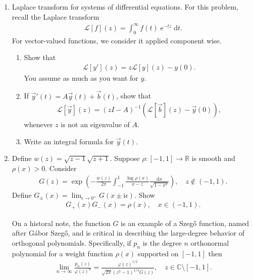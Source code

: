 \documentclass[10pt]{amsart}
\newcommand{\D}{\mathrm{d}}
\newcommand{\I}{\mathrm{i}}
\DeclareMathOperator{\E}{e}
\theoremstyle{nonumberplain}
\begin{document}
\begin{enumerate}[label={\bf {\arabic*}:}]
\item  Laplace transform for systems of differential equations.  For
  this problem, recall the Laplace transform
  \begin{align*}
    \mathcal L[f](z) = \int_0^\infty f(t) \E^{-t z} \D t.
  \end{align*}
  For vector-valued functions, we consider it applied component wise.
  \begin{enumerate}
  \item Show that
    \begin{align*}
     \mathcal L[y'](z) =  z \mathcal L[y](z) - y(0).
    \end{align*}
    You assume as much as you want for $y$.
  \item If $\vec y'(t) = A \vec y(t) + \vec b(t)$, show that
    \begin{align*}
      \mathcal L [\vec y](z) = (z I - A)^{-1} (\mathcal L[\vec b](z) -
      \vec y(0)),
    \end{align*}
    whenever $z$ is not an eigenvalue of $A$.
  \item Write an integral formula for $\vec y(t)$.\\
  \end{enumerate}

\item Define $w(z) = \sqrt{z -1} \sqrt{z + 1}$.   Suppose $\rho :
  [-1,1] \to \mathbb R$ is smooth and $\rho(x) > 0$.  Consider
  \begin{align*}
    G(z) = \exp \left(  -\frac{w(z)}{2 \pi} \int_{-1}^1  \frac{\log
    \rho(x)}{x - z} \frac{\D
   x}{\sqrt{1 - x^2}}\right), \quad z \not\in (-1,1).
  \end{align*}
  Define $G_\pm (x) = \lim_{\epsilon \to 0^+} G(x \pm \I \epsilon)$.
  Show
  \begin{align*}
    G_+(x) G_-(x)= \rho(x), \quad x \in (-1,1).
  \end{align*}

\vspace{1in}

  
  On a historal note, the function $G$ is an example of a Szeg\H{o} function, named
  after G\'abor Szeg\H{o}, and
  is critical in describing the large-degree behavior of orthogonal
  polynomials.  Specifically, if $p_n$ is the degree $n$ orthonormal
  polynomial for a weight function $\rho(x)$ supported on $[-1,1]$ then
  \begin{align*}
    \lim_{n \to \infty} \frac{p_n(z)}{\varphi(z)^n} = \frac{
    \varphi(z)^{1/2}}{\sqrt{2 \pi} (z^2 - 1)^{1/4} G(z)}, \quad z \in
    \mathbb C \setminus [-1,1].
  \end{align*}
    
\end{enumerate}

  
\end{document}
